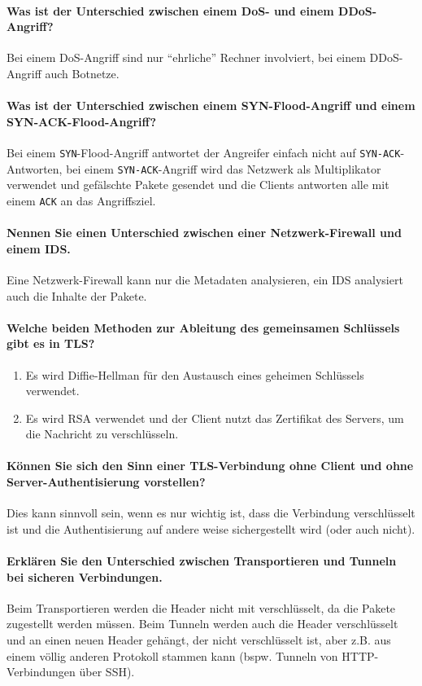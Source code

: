 \paragraph{Was ist der Unterschied zwischen einem DoS- und einem DDoS-Angriff?}
Bei einem DoS-Angriff sind nur \enquote{ehrliche} Rechner involviert, bei einem DDoS-Angriff auch Botnetze.

\paragraph{Was ist der Unterschied zwischen einem SYN-Flood-Angriff und einem SYN-ACK-Flood-Angriff?}
Bei einem \texttt{SYN}-Flood-Angriff antwortet der Angreifer einfach nicht auf \texttt{SYN-ACK}-Antworten, bei einem \texttt{SYN-ACK}-Angriff wird das Netzwerk als Multiplikator verwendet und gefälschte Pakete gesendet und die Clients antworten alle mit einem \texttt{ACK} an das Angriffsziel.

\paragraph{Nennen Sie einen Unterschied zwischen einer Netzwerk-Firewall und einem IDS.}
Eine Netzwerk-Firewall kann nur die Metadaten analysieren, ein IDS analysiert auch die Inhalte der Pakete.

\paragraph{Welche beiden Methoden zur Ableitung des gemeinsamen Schlüssels gibt es in TLS?}
\begin{enumerate}
	\item Es wird Diffie-Hellman für den Austausch eines geheimen Schlüssels verwendet.
	\item Es wird RSA verwendet und der Client nutzt das Zertifikat des Servers, um die Nachricht zu verschlüsseln.
\end{enumerate}

\paragraph{Können Sie sich den Sinn einer TLS-Verbindung ohne Client und ohne Server-Authentisierung vorstellen?}
Dies kann sinnvoll sein, wenn es nur wichtig ist, dass die Verbindung verschlüsselt ist und die Authentisierung auf andere weise sichergestellt wird (oder auch nicht).

\paragraph{Erklären Sie den Unterschied zwischen Transportieren und Tunneln bei sicheren Verbindungen.}
Beim Transportieren werden die Header nicht mit verschlüsselt, da die Pakete zugestellt werden müssen. Beim Tunneln werden auch die Header verschlüsselt und an einen neuen Header gehängt, der nicht verschlüsselt ist, aber z.B. aus einem völlig anderen Protokoll stammen kann (bspw. Tunneln von HTTP-Verbindungen über SSH).

